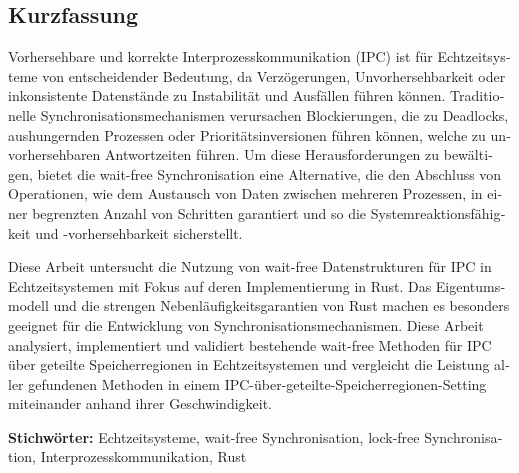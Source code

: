 \cleardoublepage

\begin{otherlanguage}{ngerman}
\chapter*{Kurzfassung}


Vorhersehbare und korrekte Interprozesskommunikation (IPC) ist für Echtzeitsysteme von entscheidender Bedeutung, da Verzögerungen, Unvorhersehbarkeit oder inkonsistente Datenstände zu Instabilität und Ausfällen führen können. Traditionelle Synchronisationsmechanismen verursachen Blockierungen, die zu Deadlocks, aushungernden Prozessen oder Prioritätsinversionen führen können, welche zu unvorhersehbaren Antwortzeiten führen. Um diese Herausforderungen zu bewältigen, bietet die wait-free Synchronisation eine Alternative, die den Abschluss von Operationen, wie dem Austausch von Daten zwischen mehreren Prozessen, in einer begrenzten Anzahl von Schritten garantiert und so die Systemreaktionsfähigkeit und -vorhersehbarkeit sicherstellt.

Diese Arbeit untersucht die Nutzung von wait-free Datenstrukturen für IPC in Echtzeitsystemen mit Fokus auf deren Implementierung in Rust. Das Eigentumsmodell und die strengen Nebenläufigkeitsgarantien von Rust machen es besonders geeignet für die Entwicklung von Synchronisationsmechanismen. Diese Arbeit analysiert, implementiert und validiert bestehende wait-free Methoden für IPC über geteilte Speicherregionen in Echtzeitsystemen und vergleicht die Leistung aller gefundenen Methoden in einem IPC-über-geteilte-Speicherregionen-Setting miteinander anhand ihrer Geschwindigkeit.

\vfill
\noindent\textbf{Stichwörter:} Echtzeitsysteme, wait-free Synchronisation, lock-free Synchronisation, Interprozesskommunikation, Rust
\vfill
\end{otherlanguage}
